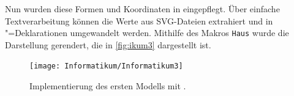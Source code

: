 Nun wurden diese Formen und Koordinaten in \Povray eingepflegt. Über einfache Textverarbeitung können die Werte aus SVG-Dateien extrahiert und in \Povray"=Deklarationen umgewandelt werden. Mithilfe des Makros \texttt{Haus} wurde die Darstellung gerendert, die in \autoref{fig:ikum3} dargestellt ist.

\begin{figure}[h]
	\centering
	\texttt{[image: Informatikum/Informatikum3]}
	\caption{Implementierung des ersten Modells mit \Povray.}
	\label{fig:ikum3}
\end{figure}
